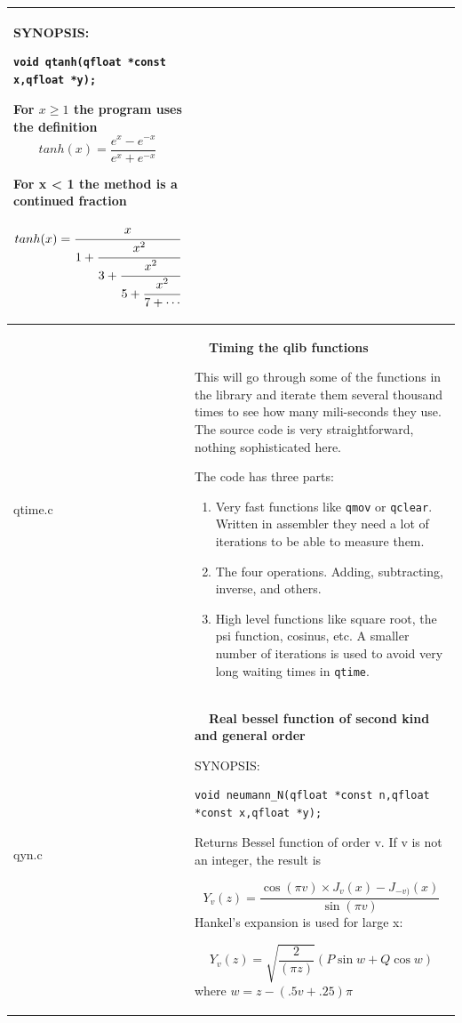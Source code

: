 \documentclass[10pt,a4paper,x11names]{memoir} %
\newcounter{entry}
\newcommand{\TOC}[1] {\addcontentsline{toc}{section}{\theentry\ \  #1} \textbf{\theentry\ \  #1} \par\stepcounter{entry}}
\begin{document}
\begin{longtable}{|p{1.5cm}|p{11.5cm}|}
	{\footnotesize SYNOPSIS:}\vspace{-0.2cm}\index{qtanh}
	\begin{lstlisting}[numbers=none]
		void qtanh(qfloat *const x,qfloat *y);
	\end{lstlisting}\vspace{-0.2cm}
	
	For $x \ge 1$ the program uses the definition
	$$ tanh(x)=\frac{e^x -e^{-x}}{e^x+e^{-x}}$$
	
	For x < 1 the method is a continued fraction
	
	$$tanh(x)=\cfrac{x}{1+\cfrac{x^2}{3+\cfrac{x^2}{5+\cfrac{x^2}{7+\dotsb}}}}$$
	\\\hline
	qtime.c& \TOC{Timing the qlib functions}\index{timing}
	
	This will go through some of the functions in the library and iterate them several thousand times to see how many mili-seconds they use. The source code is very straightforward, nothing sophisticated here.
	
	The code has three parts:
	\begin{enumerate}
		\item Very fast functions like \verb,qmov, or \verb,qclear,. Written in assembler they need a lot of iterations to be able to measure them.
		\item The four operations. Adding, subtracting, inverse, and others.
		\item High level functions like square root, the psi function, cosinus, etc. A smaller number of iterations is used to avoid very long waiting times in \verb,qtime,.
	\end{enumerate}
	\\\hline
	qyn.c& \TOC{Real bessel function of second kind and general order}
	
	{\footnotesize SYNOPSIS:}\vspace{-0.2cm}\index{neumann\_N}
	\begin{lstlisting}[numbers=none]
	void neumann_N(qfloat *const n,qfloat *const x,qfloat *y);
	\end{lstlisting}\vspace{-0.2cm}
	Returns Bessel function of order v.
	If v is not an integer, the result is
	
	$$Y_v (z) = \frac{ \cos(\pi v) \times J_v (x) - J_{-v)}  (x) }{\sin(\pi v)}$$
	Hankel's expansion is used for large x:
	
	$$ Y_v (z) = \sqrt{\frac{2}{(\pi z)}} (P \sin w + Q \cos w)$$  where  $w = z - (.5 v + .25) \pi$  
	

\end{longtable}
\end{document}
